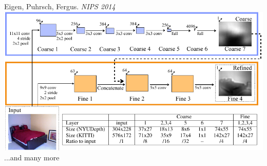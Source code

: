 \documentclass{beamer}
\begin{document}
\begin{frame}
\begin{columns}[T]
\begin{column}{.6\textwidth}
\tiny{Eigen, Puhrsch, Fergus. \emph{NIPS 2014}} \\
\includegraphics[scale=0.35]{./Figures/network3.pdf} \\
...and many more 
\end{column}
\end{columns}
\end{frame} 
\end{document}
